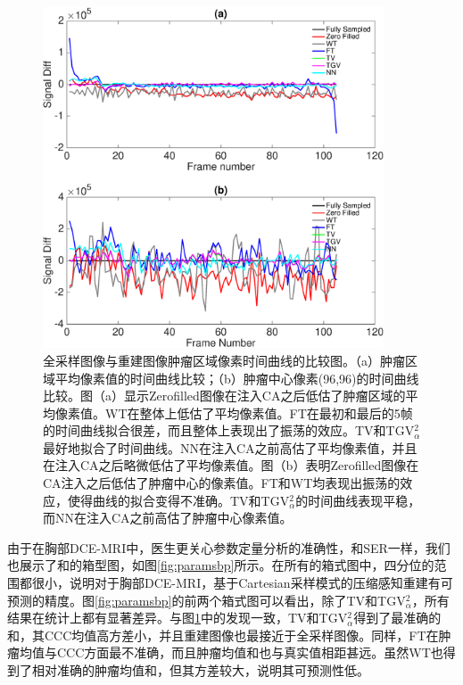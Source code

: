 \begin{figure}[htbp]
\centerline
{\includegraphics[width=0.9\textwidth]{img/qetsr/figure6.eps}}
\caption{
全采样图像与重建图像肿瘤区域像素时间曲线的比较图。（a）肿瘤区域平均像素值的时间曲线比较；（b）肿瘤中心像素(96,96)的时间曲线比较。图（a）显示Zerofilled图像在注入CA之后低估了肿瘤区域的平均像素值。WT在整体上低估了平均像素值。FT在最初和最后的5帧的时间曲线拟合很差，而且整体上表现出了振荡的效应。TV和TGV$_{\alpha}^2$最好地拟合了时间曲线。NN在注入CA之前高估了平均像素值，并且在注入CA之后略微低估了平均像素值。图（b）表明Zerofilled图像在CA注入之后低估了肿瘤中心的像素值。FT和WT均表现出振荡的效应，使得曲线的拟合变得不准确。TV和TGV$_{\alpha}^2$的时间曲线表现平稳，而NN在注入CA之前高估了肿瘤中心像素值。
}
\label{fig:curves}
\end{figure}

由于在胸部DCE-MRI中，医生更关心参数定量分析的准确性，和SER一样，我们也展示了\kt 和\Ve 的箱型图，如图\ref{fig:paramsbp}所示。在所有的箱式图中，四分位的范围都很小，说明对于胸部DCE-MRI，基于Cartesian采样模式的压缩感知重建有可预测的精度。图\ref{fig:paramsbp}的前两个箱式图可以看出，除了TV和TGV$_{\alpha}^2$，所有结果在统计上都有显著差异。与图\ref{fig:curves}中的发现一致，TV和TGV$_{\alpha}^2$得到了最准确的\kt 和\Ve，其CCC均值高方差小，并且重建图像也最接近于全采样图像。同样，FT在肿瘤均值与CCC方面最不准确，而且肿瘤均值\kt 和\Ve 也与真实值相距甚远。虽然WT也得到了相对准确的肿瘤均值\kt 和\Ve，但其方差较大，说明其可预测性低。

